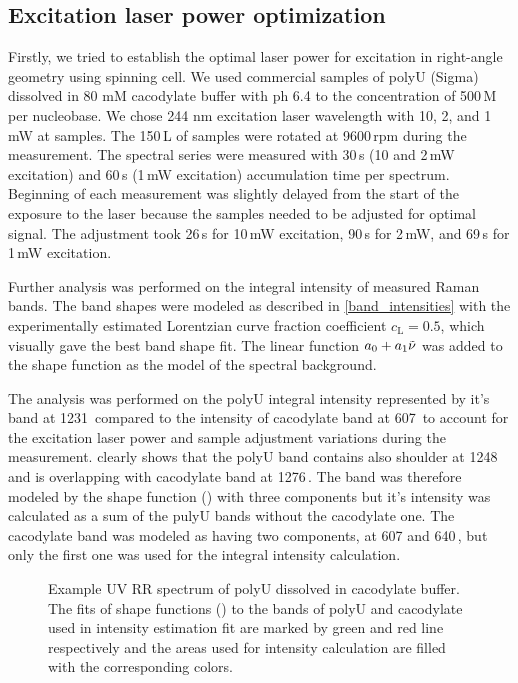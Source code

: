 \subsection{Excitation laser power optimization}
\label{subsec:power_optim}

Firstly, we tried to establish the optimal laser power for excitation in
right-angle geometry using spinning cell. We used commercial samples of polyU
(Sigma) dissolved in 80 mM cacodylate buffer with ph 6.4 to the concentration
of 500\,M per nucleobase. We chose 244 nm excitation laser wavelength with
10, 2, and 1 mW at samples. The 150\,L of samples were rotated at
9600\,rpm during the measurement. The spectral series were measured with 30\,s
(10 and 2\,mW excitation) and 60\,s (1\,mW excitation) accumulation time per
spectrum. Beginning of each measurement was slightly delayed from the start of
the exposure to the laser because the samples needed to be adjusted for
optimal signal. The adjustment took 26\,s for 10\,mW excitation, 90\,s for
2\,mW, and 69\,s for 1\,mW excitation.

Further analysis was performed on the integral intensity of measured Raman
bands. The band shapes were modeled as described in
\cref{band_intensities}
with the experimentally estimated Lorentzian curve fraction coefficient
$c_\text{L} = 0.5$, which visually gave the best band shape fit. The
linear function $a_0 + a_1\tilde{\nu}$ was added to the shape function
as the model of the spectral background.

The analysis was performed on the polyU integral intensity represented by
it's band at 1231\,\icm{} compared to the intensity of cacodylate band at
607\,\icm{} to account for the excitation laser power and sample adjustment
variations during the measurement.
clearly shows that the polyU band contains also shoulder at 1248\,\icm{} and
is overlapping with cacodylate band at 1276\,\icm. The band was therefore
modeled by the shape function
()
with three components but it's intensity was calculated as a sum of the pulyU
bands without the cacodylate one. The cacodylate band was modeled as having
two components, at 607 and 640\,\icm, but only the first one was used for the
integral intensity calculation.

\begin{figure}
	\centering
	
	\caption{Example UV RR spectrum of polyU dissolved in cacodylate buffer. The
		fits of shape functions () to the bands of
		polyU and cacodylate used in intensity estimation fit are marked by green
		and red line respectively and the areas used for intensity calculation are
		filled with the corresponding colors.}
	\label{\figlabel{power_optim:triplexes_pU}}
\end{figure}

